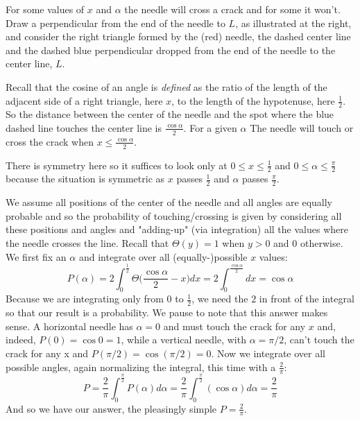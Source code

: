 \documentclass[11pt]{tufte-handout}
\begin{document}
For some values of $x$ and $\alpha$ the needle will cross a crack and for some it won't.  Draw a perpendicular from the end of the needle to $L$, as illustrated at the right, and consider the right triangle formed by the (red) needle, the dashed center line and the dashed blue perpendicular dropped from the end of the needle to the center line, $L$.
\begin{marginfigure}
\end{marginfigure}


Recall that the cosine of an angle is {\it defined}  as the ratio of the length of the adjacent side of a right triangle, here $x$, to the length of the hypotenuse, here $\frac{1}{2}$. So the distance between the center of the needle and the spot where the blue dashed line touches the center line is $\frac{\cos \alpha}{2}$. For a given $\alpha$ The needle will touch or cross the crack when $x \leq \frac{\cos\alpha}{2}$. 

There is symmetry here so it suffices to look only at $0 \leq x \leq \frac{1}{2}$ and $0 \leq \alpha \leq \frac{\pi}{2}$ because the situation is symmetric as $x$ passes $\frac{1}{2}$ and $\alpha$ passes $\frac{\pi}{2}$. 

We assume all positions of the center of the needle and all angles are equally probable and so the probability of touching/crossing is given by considering all these positions and angles and "adding-up" (via integration) all the values where the needle crosses the line.  Recall that $\Theta(y) = 1$ when $y>0$ and $0$ otherwise. We first fix an $\alpha$ and integrate over all (equally-)possible $x$ values: 
\[
P(\alpha) = 2\int_0^{\frac{1}{2}}\Theta\bigg(\frac{\cos\alpha}{2} - x\bigg)dx = 2\int_0^\frac{\cos\alpha}{2} dx =  \cos \alpha
\]
Because we are integrating only from $0$ to $\frac{1}{2}$, we need the $2$ in front of the integral so that our result is a probability. We pause to note that this answer makes sense.  A horizontal needle has $\alpha=0$ and must touch the crack for any $x$ and, indeed, $P(0)=\cos 0 = 1$, while a vertical needle, with $\alpha=\pi/2$, can't touch the crack for any x and $P(\pi/2) = \cos (\pi/2) = 0$. 
Now we integrate over all possible angles, again normalizing the integral, this time with a $\frac{2}{\pi}$:
\[
P = 
\frac{2}{\pi}\int_0^\frac{\pi}{2} P(\alpha) d\alpha = \frac{2}{\pi}\int_0^\frac{\pi}{2} (\cos\alpha) d\alpha = \frac{2}{\pi}
\]
And so we have our answer, the pleasingly simple $P=\frac{2}{\pi}$.
\end{document}
